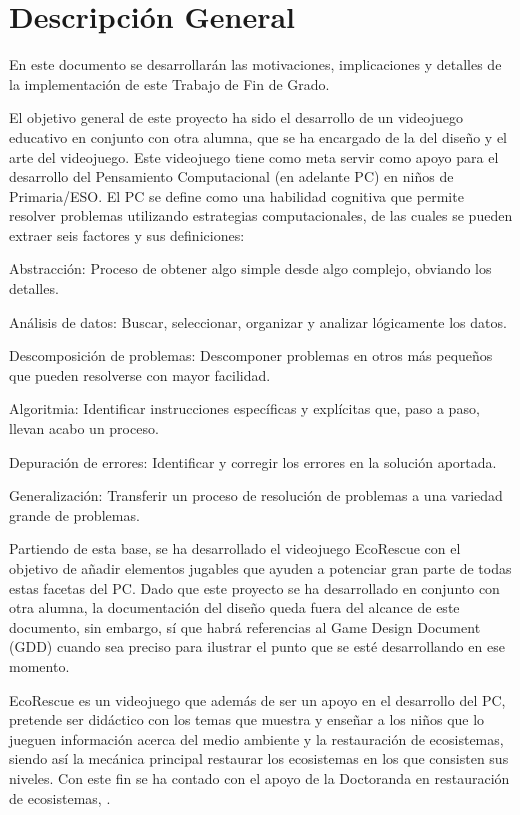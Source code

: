 \section{Descripción General}
En este documento se desarrollarán las motivaciones, implicaciones y detalles de la implementación de este Trabajo de Fin de Grado.

El objetivo general de este proyecto ha sido el desarrollo de un videojuego educativo en conjunto con otra alumna, \nombrecoautorespacio que se ha encargado de la del diseño y el arte del videojuego.
Este videojuego tiene como meta servir como apoyo para el desarrollo del Pensamiento Computacional (en adelante PC) en niños de Primaria/ESO. El PC se define como una habilidad cognitiva que permite resolver problemas
 utilizando estrategias computacionales\cite{tesismaria}, de las cuales se pueden extraer seis factores y sus definiciones\cite{tesismaria}:
\begin{compactitem}
    \item Abstracción: Proceso de obtener algo simple desde algo complejo, obviando los detalles.
    \item Análisis de datos: Buscar, seleccionar, organizar y analizar lógicamente los datos. 
    \item Descomposición de problemas: Descomponer problemas en otros más pequeños que pueden resolverse con mayor facilidad. 
    \item Algoritmia: Identificar instrucciones específicas y explícitas que, paso a paso, llevan acabo un proceso.
    \item Depuración de errores: Identificar y corregir los errores en la solución aportada.
    \item Generalización: Transferir un proceso de resolución de problemas a una variedad grande de problemas.
\end{compactitem}

Partiendo de esta base, se ha desarrollado el videojuego EcoRescue con el objetivo de añadir elementos jugables que ayuden a potenciar gran parte de todas estas facetas del PC. Dado que este proyecto se ha desarrollado en conjunto con otra alumna, la documentación del diseño queda fuera del alcance de este documento, sin embargo, sí que habrá referencias al Game Design Document (GDD) cuando sea preciso para ilustrar el punto que se esté desarrollando en ese momento.

EcoRescue es un videojuego que además de ser un apoyo en el desarrollo del PC, pretende ser didáctico con los temas que muestra y enseñar a los niños que lo jueguen información acerca del medio ambiente y la restauración de ecosistemas, siendo así la mecánica principal restaurar los ecosistemas en los que consisten sus niveles. Con este fin se ha contado con el apoyo de la Doctoranda en restauración de ecosistemas, \nombreproductor.

